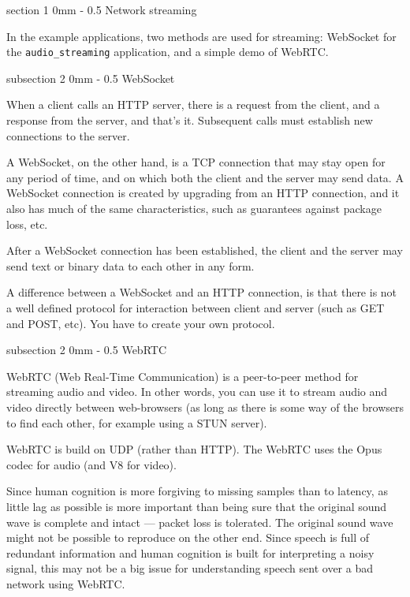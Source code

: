 \documentclass[11pt, a4paper, twoside]{article}
\makeatletter
\renewcommand{\subsection}{\@startsection
  {subsection}%
  {2}%
  {0mm}%
  {-\baselineskip}%
  {0.5\baselineskip}%
  {\bfseries\sffamily\large}}%
\renewcommand{\section}{\@startsection
  {section}%
  {1}%
  {0mm}%
  {-\baselineskip}%
  {0.5\baselineskip}%
  {\bfseries\sffamily\Large}}%
\makeatother
\begin{document}
\section{Network streaming}

In the example applications, two methods are used for streaming: WebSocket for the {\tt audio\_streaming} application, and a simple demo of WebRTC.

\subsection{WebSocket}

When a client calls an HTTP server, there is a request from the
client, and a response from the server, and that's it. Subsequent
calls must establish new connections to the server.

A WebSocket, on the other hand, is a TCP connection that may stay open
for any period of time, and on which both the client and the server
may send data. A WebSocket connection is created by upgrading from an
HTTP connection, and it also has much of the same characteristics,
such as guarantees against package loss, etc.

After a WebSocket connection has been established, the
client and the server may send text or binary data to each other in
any form.

A difference between a WebSocket and an HTTP connection, is that
there is not a well defined protocol for interaction between client
and server (such as GET and POST, etc). You have to create your own
protocol. 

\subsection{WebRTC}





WebRTC (Web Real-Time Communication) \cite{webrtc} is a peer-to-peer method for
streaming audio and video. In other words, you can use it to stream
audio and video directly between web-browsers (as long as there is
some way of the browsers to find each other, for example using a STUN
server).

WebRTC is build on UDP (rather than HTTP). The WebRTC uses the Opus
codec for audio (and V8 for video).

Since human cognition is more forgiving to missing samples than to
latency, as little lag as possible is more important than being sure
that the original sound wave is complete and intact --- packet loss is
tolerated. The original sound wave might not be possible to reproduce
on the other end. Since speech is full of redundant information and
human cognition is built for interpreting a noisy signal, this may not
be a big issue for understanding speech sent over a bad network using
WebRTC.
\end{document}

